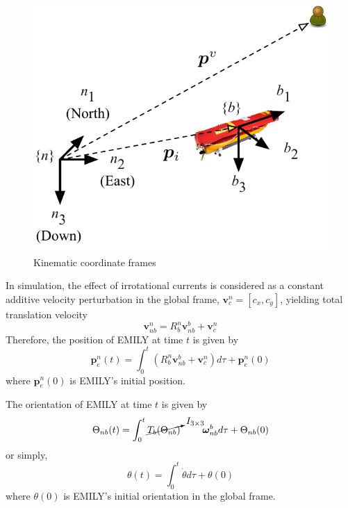 \documentclass[conference]{IEEEtran}
\begin{document}
\begin{figure}[h]
  \centering
  \includegraphics[scale=0.6]{figs/kin.pdf}
  \caption{Kinematic coordinate frames}
  \label{fig:kin}
\end{figure}

In simulation, the effect of irrotational currents is considered as a constant additive velocity perturbation in the global frame, $\bm{v}_c^n = [c_x, c_y]$, yielding total translation velocity
\begin{equation}
  \bm{v}_{nb}^n = R_b^n \bm{v}_{nb}^b + \bm{v}_c^n
\end{equation}
Therefore, the position of EMILY at time $t$ is given by
\begin{equation}
  \bm{p}_e^n(t) = \int_0^t (R_b^n \bm{v}_{nb}^b + \bm{v}_c^n)d\tau + \bm{p}_e^n(0)
\end{equation}
where $\bm{p}_e^n(0)$ is EMILY's initial position.

The orientation of EMILY at time $t$ is given by
\begin{equation}
  \Theta_{nb}(t) = \int_0^t \cancelto{I_{3 \times 3}}{T_b (\Theta_{nb})} \hspace{0.8cm} \bm{\omega}_{nb}^b d\tau + \Theta_{nb}(0)
\end{equation}
or simply,
\begin{equation}
  \theta(t) = \int_0^t \dot{\theta}d\tau + \theta(0)
\end{equation}
where $\theta(0)$ is EMILY's initial orientation in the global frame.
\end{document}
